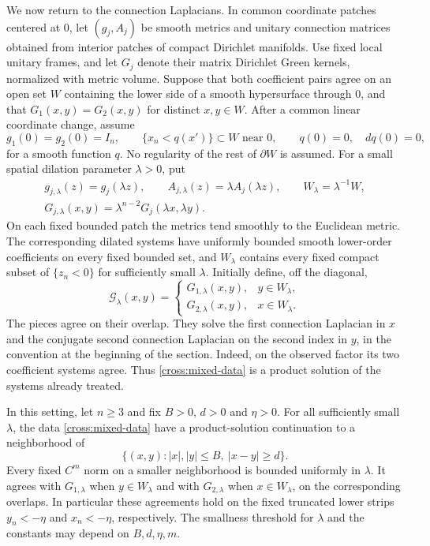 We now return to the connection Laplacians.  In common coordinate
patches centered at $0$, let $(g_j,A_j)$ be smooth metrics and unitary
connection matrices obtained from interior patches of compact Dirichlet
manifolds.  Use fixed local unitary frames, and let $G_j$ denote their
matrix Dirichlet Green kernels, normalized with metric volume.
Suppose that both coefficient pairs agree on an open set $W$ containing
the lower side of a smooth hypersurface through $0$, and that
$G_1(x,y)=G_2(x,y)$ for distinct $x,y\in W$.  After a common linear
coordinate change, assume
\[
 g_1(0)=g_2(0)=I_n,\qquad
 \{x_n<q(x')\}\subset W\text{ near }0,\qquad
 q(0)=0,\quad d q(0)=0,
\]
for a smooth function $q$.  No regularity of the rest of $\partial W$
is assumed.
For a small spatial dilation parameter $\lambda>0$, put
\begin{equation}\label{cross:dilation}
 \begin{gathered}
 g_{j,\lambda}(z)=g_j(\lambda z),\qquad
 A_{j,\lambda}(z)=\lambda A_j(\lambda z),\qquad
 W_\lambda=\lambda^{-1}W,\\
 G_{j,\lambda}(x,y)=\lambda^{n-2}G_j(\lambda x,\lambda y).
 \end{gathered}
\end{equation}
On each fixed bounded patch the metrics tend smoothly to the Euclidean
metric.  The corresponding dilated systems have uniformly bounded
smooth lower-order coefficients on every fixed bounded set, and
$W_\lambda$ contains every fixed compact subset of $\{z_n<0\}$ for
sufficiently small $\lambda$.
Initially define, off the diagonal,
\begin{equation}\label{cross:mixed-data}
 \mathcal G_\lambda(x,y)=
 \begin{cases}
 G_{1,\lambda}(x,y),&y\in W_\lambda,\\
 G_{2,\lambda}(x,y),&x\in W_\lambda.
 \end{cases}
\end{equation}
The pieces agree on their overlap.  They solve the first connection
Laplacian in $x$ and the conjugate second connection Laplacian on the
second index in $y$, in the convention at the beginning of the section.
Indeed, on the observed factor its two coefficient systems agree.
Thus \eqref{cross:mixed-data} is a product solution of the systems
already treated.

\begin{proposition}\label{cross:initial}
In this setting, let $n\ge3$ and fix $B>0$, $d>0$ and $\eta>0$.
For all sufficiently small $\lambda$, the data
\eqref{cross:mixed-data} have a product-solution continuation to a
neighborhood of
\[
 \{(x,y):|x|,|y|\le B,\ |x-y|\ge d\}.
\]
Every fixed $C^m$ norm on a smaller neighborhood is bounded uniformly
in $\lambda$.  It agrees with $G_{1,\lambda}$ when $y\in W_\lambda$
and with $G_{2,\lambda}$ when $x\in W_\lambda$, on the corresponding
overlaps.  In particular these agreements hold on the fixed truncated
lower strips $y_n<-\eta$ and $x_n<-\eta$, respectively.  The smallness threshold for $\lambda$ and
the constants may depend on $B,d,\eta,m$.
\end{proposition}

